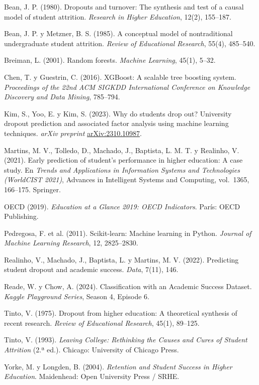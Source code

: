 \documentclass[titlepage,a4paper]{article}
\begin{document}
\begin{footnotesize}
\begin{list}{}{\setlength{\leftmargin}{1.2em}\setlength{\itemindent}{-1.2em}\setlength{\itemsep}{0pt}\setlength{\parsep}{0pt}}
\item Bean, J. P. (1980). Dropouts and turnover: The synthesis and test of a causal model of student attrition. \textit{Research in Higher Education}, 12(2), 155--187.
\item Bean, J. P. y Metzner, B. S. (1985). A conceptual model of nontraditional undergraduate student attrition. \textit{Review of Educational Research}, 55(4), 485--540.
\item Breiman, L. (2001). Random forests. \textit{Machine Learning}, 45(1), 5--32.
\item Chen, T. y Guestrin, C. (2016). XGBoost: A scalable tree boosting system. \textit{Proceedings of the 22nd ACM SIGKDD International Conference on Knowledge Discovery and Data Mining}, 785--794.
\item Kim, S., Yoo, E. y Kim, S. (2023). Why do students drop out? University dropout prediction and associated factor analysis using machine learning techniques. \textit{arXiv preprint} \href{https://arxiv.org/abs/2310.10987}{arXiv:2310.10987}.
\item Martins, M. V., Tolledo, D., Machado, J., Baptista, L. M. T. y Realinho, V. (2021). Early prediction of student's performance in higher education: A case study. En \textit{Trends and Applications in Information Systems and Technologies (WorldCIST 2021)}, Advances in Intelligent Systems and Computing, vol.\ 1365, 166--175. Springer.
\item OECD (2019). \textit{Education at a Glance 2019: OECD Indicators}. París: OECD Publishing.
\item Pedregosa, F. et al. (2011). Scikit-learn: Machine learning in Python. \textit{Journal of Machine Learning Research}, 12, 2825--2830.
\item Realinho, V., Machado, J., Baptista, L. y Martins, M. V. (2022). Predicting student dropout and academic success. \textit{Data}, 7(11), 146.
\item Reade, W. y Chow, A. (2024). Classification with an Academic Success Dataset. \textit{Kaggle Playground Series}, Season 4, Episode 6.
\item Tinto, V. (1975). Dropout from higher education: A theoretical synthesis of recent research. \textit{Review of Educational Research}, 45(1), 89--125.
\item Tinto, V. (1993). \textit{Leaving College: Rethinking the Causes and Cures of Student Attrition} (2.ª ed.). Chicago: University of Chicago Press.
\item Yorke, M. y Longden, B. (2004). \textit{Retention and Student Success in Higher Education}. Maidenhead: Open University Press / SRHE.
\end{list}
\end{footnotesize}
\end{document}

